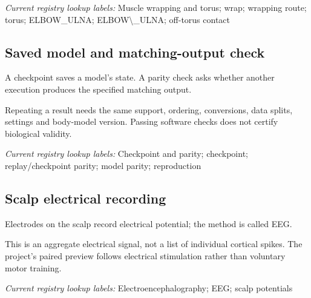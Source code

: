 \noindent\textit{Current registry lookup labels:} Muscle wrapping and torus; wrap; wrapping route; torus; ELBOW\_ULNA; ELBOW\textbackslash{}\_ULNA; off-torus contact\par

\begin{samepage}
\subsection*{Saved model and matching-output check}
\noindent A checkpoint saves a model’s state. A parity check asks whether another execution produces the specified matching output.\par
\end{samepage}
\begin{samepage}
\noindent Repeating a result needs the same support, ordering, conversions, data splits, settings and body-model version. Passing software checks does not certify biological validity.\par\nopagebreak[4]

\end{samepage}


\noindent\textit{Current registry lookup labels:} Checkpoint and parity; checkpoint; replay/checkpoint parity; model parity; reproduction\par

\begin{samepage}
\subsection*{Scalp electrical recording}
\noindent Electrodes on the scalp record electrical potential; the method is called EEG.\par
\end{samepage}
\begin{samepage}
\noindent This is an aggregate electrical signal, not a list of individual cortical spikes. The project’s paired preview follows electrical stimulation rather than voluntary motor training.\par\nopagebreak[4]

\end{samepage}


\noindent\textit{Current registry lookup labels:} Electroencephalography; EEG; scalp potentials\par

